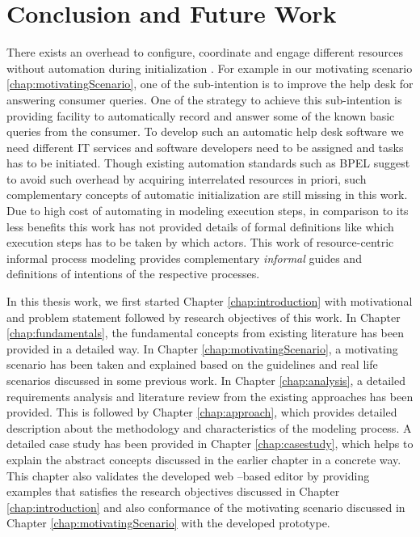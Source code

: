\chapter{Conclusion and Future Work}
\label{chap:conclusion}
There exists an overhead to configure, coordinate and engage different resources without automation during initialization \cite{Sungur2015}. For example in our motivating scenario \ref{chap:motivatingScenario}, one of the sub-intention is to improve the help desk for answering consumer queries. One of the strategy to achieve this sub-intention is providing facility to automatically record and answer some of the known basic queries from the consumer.  To develop such an automatic help desk software we need different IT services and software developers need to be assigned and tasks has to be initiated. Though existing automation standards such as BPEL suggest to avoid such overhead by acquiring interrelated resources in priori, such complementary concepts of automatic initialization are still missing in this work. Due to high cost of automating in modeling execution steps, in comparison to its less benefits \cite{Sungur2015} this work has not provided details of  formal definitions like which execution steps has to be taken by which actors. This work of resource-centric informal process modeling provides complementary \textit{informal} guides and definitions of intentions of the respective processes. 

In this thesis work, we first started Chapter \ref{chap:introduction} with motivational and problem statement followed by research objectives of this work. In Chapter \ref{chap:fundamentals}, the fundamental concepts from existing literature has been provided in a detailed way. In Chapter \ref{chap:motivatingScenario}, a motivating scenario has been taken and explained based on the guidelines and real life scenarios discussed in some previous work. In Chapter \ref{chap:analysis}, a detailed requirements analysis and literature review from the existing approaches has been provided. This is followed by Chapter \ref{chap:approach}, which provides detailed description about the methodology and characteristics of the modeling process. A detailed case study has been provided in Chapter \ref{chap:casestudy}, which helps to explain the abstract concepts discussed in the earlier chapter in a concrete way. This chapter also validates the developed web –based editor by providing examples that satisfies the research objectives discussed in Chapter \ref{chap:introduction} and also conformance of the motivating scenario discussed in Chapter \ref{chap:motivatingScenario} with the developed prototype.


